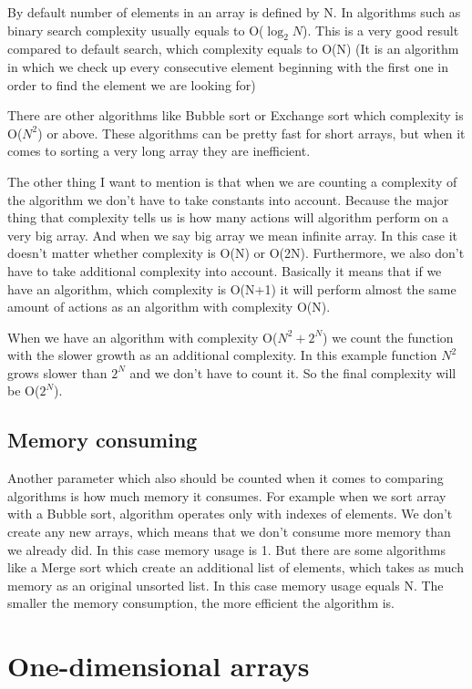 \documentclass[12pt,twoside,a4paper]{article}
\begin{document}
By default number of elements in an array is defined by N.
In algorithms such as binary search complexity usually equals to O($\log_2N$). This is a very good result compared to default search, which complexity equals to O(N) (It is an algorithm in which we check up every consecutive element beginning with the first one in order to find the element we are looking for)

There are other algorithms like Bubble sort or Exchange sort which complexity is O($N^{2}$) or above. These algorithms can be pretty fast for short arrays, but when it comes to sorting a very long array they are inefficient.

The other thing I want to mention is that when we are counting a complexity of the algorithm we don't have to take constants into account. Because the major thing that complexity tells us is how many actions will algorithm perform on a very big array. And when we say big array we mean infinite array. In this case it doesn't matter whether complexity is O(N) or O(2N). Furthermore, we also don't have to take additional complexity into account. Basically it means that if we have an algorithm, which complexity is O(N+1) it will perform almost the same amount of actions as an algorithm with complexity O(N).

When we have an algorithm with complexity O($N^{2}+2^{N}$) we count the function with the slower growth as an additional complexity. In this example function $N^{2}$ grows slower than $2^{N}$ and we don't have to count it. So the final complexity will be O($2^{N}$).

\subsection{Memory consuming}

Another parameter which also should be counted when it comes to comparing algorithms is how much memory it consumes. For example when we sort array with a Bubble sort, algorithm operates only with indexes of elements. We don't create any new arrays, which means that we don't consume more memory than we already did. In this case memory usage is 1. But there are some algorithms like a Merge sort which create an additional list of elements, which takes as much memory as an original unsorted list. In this case memory usage equals N. The smaller the memory consumption, the more efficient the algorithm is.

\section{One-dimensional arrays} \label{1_dim_arr}
\end{document}
